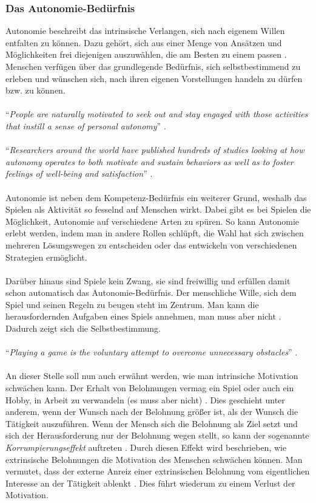 \documentclass[a4paper,12pt,twoside]{scrartcl}
\begin{document}
\subsubsection{Das Autonomie-Bedürfnis}
\label{Punkte und Belohnungen}
Autonomie beschreibt das intrinsische Verlangen, sich nach eigenem Willen entfalten zu können. Dazu gehört, sich aus einer Menge von Ansätzen und Möglichkeiten frei diejenigen auszuwählen, die am Besten zu einem passen \cite{Rigby2011}. Menschen verfügen über das grundlegende Bedürfnis, sich selbstbestimmend zu erleben und wünschen sich, nach ihren eigenen Vorstellungen handeln zu dürfen bzw. zu können.
\\\\
\enquote{\textit{People are naturally motivated to seek out and stay engaged with those activities that instill a sense of personal autonomy}} \cite{Rigby2011}.
\\\\
\enquote{\textit{Researchers around the world have published hundreds of studies looking at how autonomy operates to both motivate and sustain behaviors as well as to foster feelings of well-being and satisfaction}} \cite{Rigby2011}.
\\\\
Autonomie ist neben dem Kompetenz-Bedürfnis ein weiterer Grund, weshalb das Spielen als Aktivität so fesselnd auf Menschen wirkt. Dabei gibt es bei Spielen die Möglichkeit, Autonomie auf verschiedene Arten zu spüren. So kann Autonomie erlebt werden, indem man in andere Rollen schlüpft, die Wahl hat sich zwischen mehreren Lösungswegen zu entscheiden oder das entwickeln von verschiedenen Strategien ermöglicht.
\\\\
Darüber hinaus sind Spiele kein Zwang, sie sind freiwillig und erfüllen damit schon automatisch das Autonomie-Bedürfnis. Der menschliche Wille, sich dem Spiel und seinen Regeln zu beugen steht im Zentrum. Man kann die herausfordernden Aufgaben eines Spiels annehmen, man muss aber nicht \cite{Rigby2011}. Dadurch zeigt sich die Selbstbestimmung. 
\\\\
\enquote{\textit{Playing a game is the voluntary attempt to overcome unnecessary obstacles}} \cite{Mcgonigal2011}.
\\\\
An dieser Stelle soll nun auch erwähnt werden, wie man intrinsiche Motivation schwächen kann. Der Erhalt von Belohnungen vermag ein Spiel oder auch ein Hobby, in Arbeit zu verwandeln (es muss aber nicht) \cite{Pink2010}. Dies geschieht unter anderem, wenn der Wunsch nach der Belohnung größer ist, als der Wunsch die Tätigkeit auszuführen. Wenn der Mensch sich die Belohnung als Ziel setzt und sich der Herausforderung nur der Belohnung wegen stellt, so kann der sogenannte \textit{Korrumpierungseffekt} auftreten \cite{Rheinberg2006}. Durch diesen Effekt wird beschrieben, wie extrinsische Belohnungen die Motivation des Menschen schwächen können. Man vermutet, dass der externe Anreiz einer extrinsischen Belohnung vom eigentlichen Interesse an der Tätigkeit ablenkt \cite{Rheinberg2006}. Dies führt wiederum zu einem Verlust der Motivation.   
\end{document}
